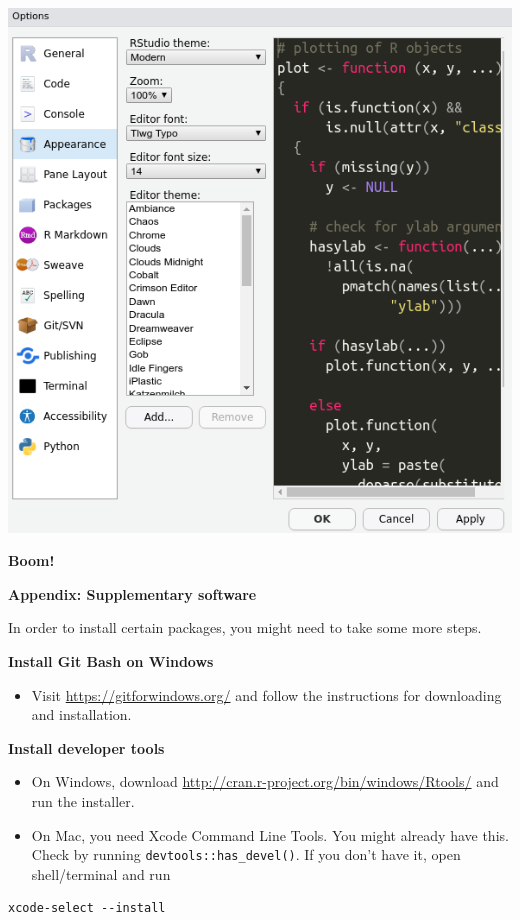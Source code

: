 \documentclass[
]{book}
\providecommand{\tightlist}{%
  \setlength{\itemsep}{0pt}\setlength{\parskip}{0pt}}
\begin{document}
\includegraphics{img/rstudio_theme.png}

\textbf{Boom!}

\textbf{Appendix: Supplementary software}

In order to install certain packages, you might need to take some more steps.

\textbf{Install Git Bash on Windows}

\begin{itemize}
\tightlist
\item
  Visit \url{https://gitforwindows.org/} and follow the instructions for downloading and installation.
\end{itemize}

\textbf{Install developer tools}

\begin{itemize}
\tightlist
\item
  On Windows, download \url{http://cran.r-project.org/bin/windows/Rtools/} and run the installer.
\item
  On Mac, you need Xcode Command Line Tools. You might already have this. Check by running \texttt{devtools::has\_devel()}. If you don't have it, open shell/terminal and run
\end{itemize}

\begin{verbatim}
xcode-select --install
\end{verbatim}
\end{document}
